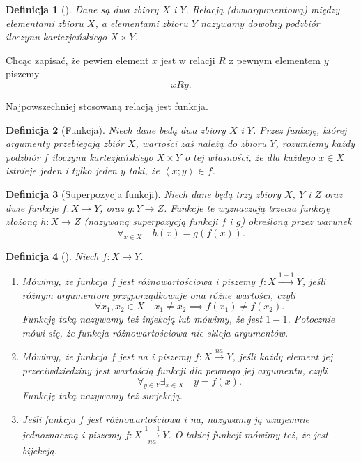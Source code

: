 \documentclass[12pt,a4paper]{report}
\newtheorem{definition}{Definicja}[chapter]
\newcommand{\parauporzadkowana}[2]{\left\langle {#1}; {#2} \right\rangle}
\begin{document}
\begin{definition}[\citep{kraszewski2007wstkep}]
Dane są dwa zbiory $X$ i $Y$. Relacją (dwuargumentową) między elementami zbioru $X$, a elementami zbioru $Y$ nazywamy dowolny podzbiór iloczynu kartezjańskiego $X \times Y$.
\end{definition}
Chcąc zapisać, że pewien element $x$ jest w relacji $R$ z pewnym elementem $y$ piszemy
$$
xRy.
$$

Najpowszechniej stosowaną relacją jest funkcja.

\begin{definition}[Funkcja\citep{kuratowski1966wstkep}]
Niech dane bedą dwa zbiory $X$ i $Y$. Przez funkcję, której argumenty przebiegają zbiór $X$, wartości zaś należą do zbioru $Y$, rozumiemy każdy podzbiór $f$ iloczynu kartezjańskiego $X \times Y$ o tej własności, że dla każdego $x \in X$ istnieje jeden i tylko jeden $y$ taki, że $\parauporzadkowana{x}{y} \in f$. 

\end{definition}
\begin{definition}[Superpozycja funkcji\citep{kuratowski1966wstkep}]
Niech dane będą trzy zbiory $X$, $Y$ i $Z$ oraz dwie funkcje $f:X\to Y$, oraz $g:Y\to Z$. Funkcje te wyznaczają trzecia funkcję złożoną $h:X\to Z$ (nazywaną superpozycją funkcji $f$ i $g$) określoną przez warunek
\begin{equation*}
\forall_{x \in X} \quad h(x)=g(f(x)).
\end{equation*}
\end{definition}

\begin{definition}[\citep{kraszewski2007wstkep}]
Niech $f:X \to Y$.
\begin{enumerate}
\item
Mówimy, że funkcja $f$ jest różnowartościowa i piszemy $f:X\xrightarrow{1-1} Y$, jeśli różnym argumentom przyporządkowuje ona różne wartości, czyli
\begin{equation*}
\forall{x_{1},x_{2}}\in X \quad x_{1}\ne x_{2} \implies f(x_{1})\ne f(x_{2}).
\end{equation*}
Funkcję taką nazywamy też injekcją lub mówimy, że jest $1-1$. Potocznie mówi się, że funkcja różnowartościowa nie skleja argumentów.
\item
Mówimy, że funkcja $f$ jest na i piszemy $f:X\xrightarrow{na}Y$, jeśli każdy element jej przeciwdziedziny jest wartością funkcji dla pewnego jej argumentu, czyli
\begin{equation*}
\forall_{y\in Y} \exists_{x\in X} \quad y=f(x).
\end{equation*}
Funkcję taką nazywamy też surjekcją.
\item
Jeśli funkcja $f$ jest różnowartościowa i na, nazywamy ją wzajemnie jednoznaczną i piszemy $f:X\xrightarrow[na]{1-1} Y$. O takiej funkcji mówimy też, że jest bijekcją.
\end{enumerate}
\end{definition}
\end{document}
